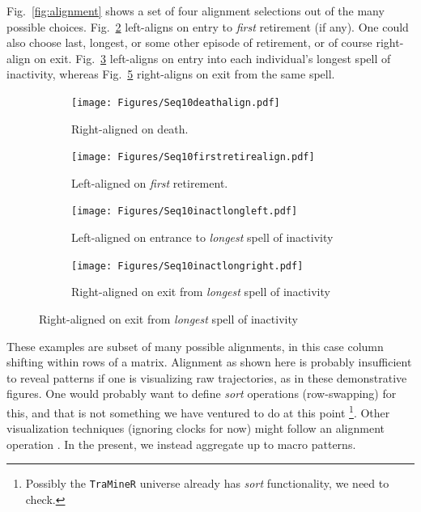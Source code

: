 \documentclass{article}
\begin{document}
Fig.~\ref{fig:alignment} shows a set of four alignment selections out of the
many possible choices. Fig.~\ref{fig:firstretire} left-aligns on
entry to \emph{first} retirement (if any). One could also choose last, longest,
or some other episode of retirement, or of course right-align on exit.
Fig.~\ref{fig:longinactleft} left-aligns on entry into each individual's
longest spell of inactivity, whereas Fig.~\ref{fig:longinactright} right-aligns on exit from
the same spell.

 \begin{figure}[ht!]
\centering
\caption{The sequences from Figure~\ref{fig:seq10} under a variety of alignment
types.}
\label{fig:alignment}

\begin{subfigure}{\textwidth}
\centering
\caption{Right-aligned on death.}
\label{fig:seq10death}
\texttt{[image: Figures/Seq10deathalign.pdf]}
\end{subfigure}

\begin{subfigure}{\textwidth}
\centering
\caption{Left-aligned on \emph{first} retirement.}
\label{fig:firstretire}
\texttt{[image: Figures/Seq10firstretirealign.pdf]}
\end{subfigure}

\begin{subfigure}{\textwidth}
\centering
\caption{Left-aligned on entrance to \emph{longest} spell of inactivity}
\label{fig:longinactleft}
\texttt{[image: Figures/Seq10inactlongleft.pdf]}
\end{subfigure}

\begin{subfigure}{\textwidth}
\centering
\caption{Right-aligned on exit from \emph{longest} spell of inactivity}
\label{fig:longinactright}
\texttt{[image: Figures/Seq10inactlongright.pdf]}
\end{subfigure}

\end{figure}

These examples are subset of many possible alignments, in this case column shifting within rows of a matrix. Alignment as shown here is probably insufficient to reveal patterns if one is visualizing raw trajectories, as in these demonstrative figures. One would probably want to define \emph{sort} operations (row-swapping) for this, and that is not something we have ventured to do at this point \footnote{Possibly the \texttt{TraMineR} universe already has \emph{sort} functionality, we need to check.}. Other visualization techniques (ignoring clocks for now) might follow an alignment operation \citep[e.g.][]{fasang2014visualizing}. In the present, we instead aggregate up to macro patterns.
\end{document}
